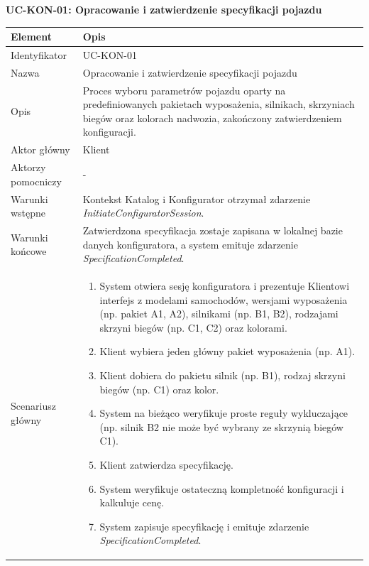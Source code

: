 \textbf{UC-KON-01: Opracowanie i zatwierdzenie specyfikacji pojazdu}

\begin{longtable}{|p{4cm}|p{11cm}|}
\hline
\textbf{Element} & \textbf{Opis} \\
\hline

Identyfikator & UC-KON-01 \\
\hline

Nazwa & Opracowanie i zatwierdzenie specyfikacji pojazdu \\
\hline

Opis & 
Proces wyboru parametrów pojazdu oparty na predefiniowanych pakietach wyposażenia, silnikach, skrzyniach biegów oraz kolorach nadwozia, zakończony zatwierdzeniem konfiguracji. \\
\hline

Aktor główny & Klient \\
\hline

Aktorzy pomocniczy & - \\
\hline

Warunki wstępne & 
Kontekst Katalog i Konfigurator otrzymał zdarzenie \textit{InitiateConfiguratorSession}. \\
\hline

Warunki końcowe & 
Zatwierdzona specyfikacja zostaje zapisana w lokalnej bazie danych konfiguratora, a system emituje zdarzenie \textit{SpecificationCompleted}. \\
\hline

Scenariusz główny & 
\begin{enumerate}
    \item System otwiera sesję konfiguratora i prezentuje Klientowi interfejs z modelami samochodów, wersjami wyposażenia (np. pakiet A1, A2), silnikami (np. B1, B2), rodzajami skrzyni biegów (np. C1, C2) oraz kolorami.
    \item Klient wybiera jeden główny pakiet wyposażenia (np. A1).
    \item Klient dobiera do pakietu silnik (np. B1), rodzaj skrzyni biegów (np. C1) oraz kolor.
    \item System na bieżąco weryfikuje proste reguły wykluczające (np. silnik B2 nie może być wybrany ze skrzynią biegów C1).
    \item Klient zatwierdza specyfikację.
    \item System weryfikuje ostateczną kompletność konfiguracji i kalkuluje cenę.
    \item System zapisuje specyfikację i emituje zdarzenie \textit{SpecificationCompleted}.
\end{enumerate} \\
\hline


\end{longtable}
